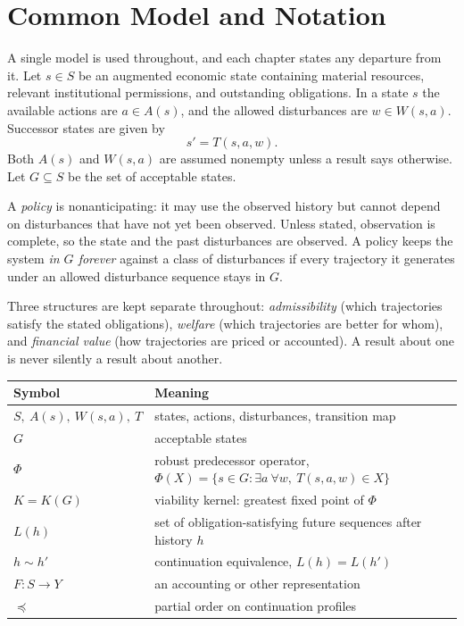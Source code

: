 \chapter*{Common Model and Notation}

A single model is used throughout, and each chapter states any departure from it. Let $s\in S$ be an augmented economic state containing material resources, relevant institutional permissions, and outstanding obligations. In a state $s$ the available actions are $a\in A(s)$, and the allowed disturbances are $w\in W(s,a)$. Successor states are given by
\[
s' = T(s,a,w).
\]
Both $A(s)$ and $W(s,a)$ are assumed nonempty unless a result says otherwise. Let $G\subseteq S$ be the set of acceptable states.

A \emph{policy} is nonanticipating: it may use the observed history but cannot depend on disturbances that have not yet been observed. Unless stated, observation is complete, so the state and the past disturbances are observed. A policy keeps the system \emph{in $G$ forever} against a class of disturbances if every trajectory it generates under an allowed disturbance sequence stays in $G$.

Three structures are kept separate throughout: \emph{admissibility} (which trajectories satisfy the stated obligations), \emph{welfare} (which trajectories are better for whom), and \emph{financial value} (how trajectories are priced or accounted). A result about one is never silently a result about another.

\begin{center}
\small
\renewcommand{\arraystretch}{1.2}
\begin{tabular}{@{}ll@{}}
\toprule
Symbol & Meaning\\
\midrule
$S,\ A(s),\ W(s,a),\ T$ & states, actions, disturbances, transition map\\
$G$ & acceptable states\\
$\Phi$ & robust predecessor operator, $\Phi(X)=\{s\in G:\exists a\ \forall w,\ T(s,a,w)\in X\}$\\
$K=K(G)$ & viability kernel: greatest fixed point of $\Phi$\\
$L(h)$ & set of obligation-satisfying future sequences after history $h$\\
$h\sim h'$ & continuation equivalence, $L(h)=L(h')$\\
$F:S\to Y$ & an accounting or other representation\\
$\preceq$ & partial order on continuation profiles\\
\bottomrule
\end{tabular}
\end{center}
